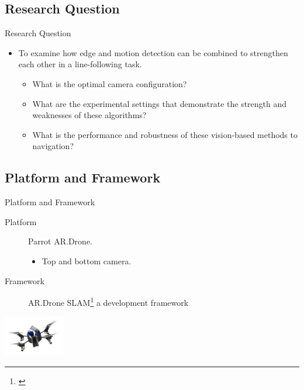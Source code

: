 \documentclass{beamer}
\begin{document}
\subsection{Research Question}
\begin{frame}
\begin{block}{Research Question}
\begin{itemize}
\item To examine how edge and motion detection can be combined to strengthen each other in a line-following task.
\begin{itemize}
\item What is the optimal camera configuration?
\item What are the experimental settings that demonstrate the strength and weaknesses of these algorithms?
\item What is the performance and robustness of these vision-based methods to navigation?
\end{itemize}
\end{itemize}
\end{block}
\end{frame}

\subsection{Platform and Framework}
\begin{frame}
\begin{block}{Platform and Framework}
\begin{description}
\item[Platform] Parrot AR.Drone.
\begin{itemize}
\item Top and bottom camera.
\end{itemize}
\item[Framework] AR.Drone SLAM\footnote{\cite{Dijkshoorn2012}} a development framework
\end{description}
\end{block}
\begin{center}
\includegraphics[width = 0.2\textwidth]{images/ardrone.jpg}
\end{center}
\end{frame}
\end{document}
